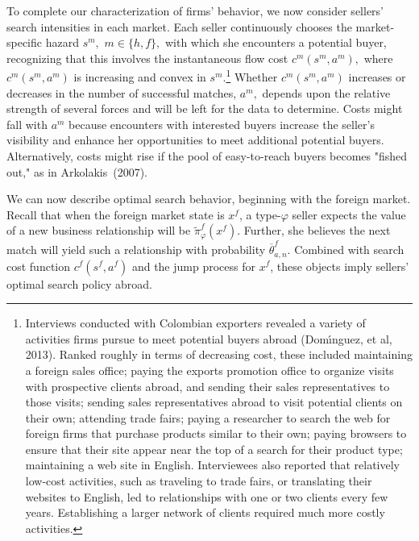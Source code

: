 \documentclass[12pt]{article}
\begin{document}
To complete our characterization of firms' behavior, we now consider
sellers' search intensities in each market. Each seller continuously chooses
the market-specific hazard $s^{m},$ $m\in \{h,f\},$ with which she
encounters a potential buyer, recognizing that this involves the
instantaneous flow cost $c^{m}(s^{m},a^{m}),$ where $c^{m}(s^{m},a^{m})$ is
increasing and convex in $s^{m}.$\footnote{%
Interviews conducted with Colombian exporters revealed a variety of
activities firms pursue to meet potential buyers abroad (Dom\'{\i}nguez, et
al, 2013). Ranked roughly in terms of decreasing cost, these included
maintaining a foreign sales office; paying the exports promotion office to
organize visits with prospective clients abroad, and sending their sales
representatives to those visits; sending sales representatives abroad to
visit potential clients on their own; attending trade fairs; paying a
researcher to search the web for foreign firms that purchase products
similar to their own; paying browsers to ensure that their site appear near
the top of a search for their product type; maintaining a web site in
English. Interviewees also reported that relatively low-cost activities,
such as traveling to trade fairs, or translating their websites to English,
led to relationships with one or two clients every few years. Establishing a
larger network of clients required much more costly activities.} Whether $%
c^{m}(s^{m},a^{m})$ increases or decreases in the number of successful
matches, $a^{m},$ depends upon the relative strength of several forces and
will be left for the data to determine. Costs might fall with $a^{m}$
because encounters with interested buyers increase the seller's visibility
and enhance her opportunities to meet additional potential buyers.
Alternatively, costs might rise if the pool of easy-to-reach buyers becomes
"fished out," as in Arkolakis\ (2007).

We can now describe optimal search behavior, beginning with the foreign
market. Recall that when the foreign market state is $x^{f}$, a type-$%
\varphi $ seller expects the value of a new business relationship will be $%
\widetilde{\pi }_{\varphi }^{f}(x^{f}).$ Further, she believes the next
match will yield such a relationship with probability $\overline{\theta }%
_{a,n}^{f}$. Combined with search cost function $c^{f}(s^{f},a^{f})$ and the
jump process for $x^{f}$, these objects imply sellers' optimal search policy
abroad.
\end{document}
